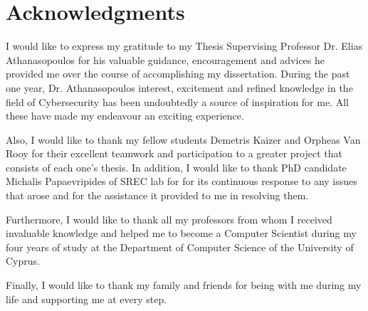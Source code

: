 \section*{\LARGE{Acknowledgments}}

I would like to express my gratitude to my Thesis Supervising Professor Dr. Elias Athanasopoulos
for his valuable guidance, encouragement and advices he provided me over the course of accomplishing my
dissertation. During the past one year, Dr. Athanasopoulos interest, excitement and refined knowledge in
the field of Cybersecurity has been undoubtedly a source of inspiration for me. All these have made my 
endeavour an exciting experience.

Also, Ι would like to thank my fellow students Demetris Kaizer and Orpheas Van Rooy for their excellent
teamwork and participation to a greater project that consists of each one's thesis. In addition, Ι would
like to thank PhD candidate Michalis Papaevripides of SREC lab for for its continuous response to any 
issues that arose and for the assistance it provided to me in resolving them.

Furthermore, I would like to thank all my professors from whom I received invaluable knowledge and helped
me to become a Computer Scientist during my four years of study at the Department of Computer Science of
the University of Cyprus.

Finally, I would like to thank my family and friends for being with me during my life and
supporting me at every step.